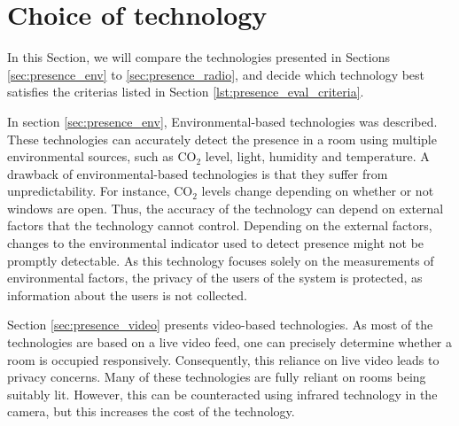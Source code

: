 \section{Choice of technology}
In this Section, we will compare the technologies presented in Sections \ref{sec:presence_env} to \ref{sec:presence_radio}, and decide which technology best satisfies the criterias listed in Section \ref{lst:presence_eval_criteria}. 

In section \ref{sec:presence_env}, Environmental-based technologies was described. These technologies can accurately detect the presence in a room using multiple environmental sources, such as $\text{CO}_{2}$ level, light, humidity and temperature.
A drawback of environmental-based technologies is that they suffer from unpredictability.
For instance, $\text{CO}_{2}$ levels change depending on whether or not windows are open.
Thus, the accuracy of the technology can depend on external factors that the technology cannot control.
Depending on the external factors, changes to the environmental indicator used to detect presence might not be promptly detectable.
As this technology focuses solely on the measurements of environmental factors, the privacy of the users of the system is protected, as information about the users is not collected.

Section \ref{sec:presence_video} presents video-based technologies.
As most of the technologies are based on a live video feed, one can precisely determine whether a room is occupied responsively. 
Consequently, this reliance on live video leads to privacy concerns.
Many of these technologies are fully reliant on rooms being suitably lit.
However, this can be counteracted using infrared technology in the camera, but this increases the cost of the technology.   

